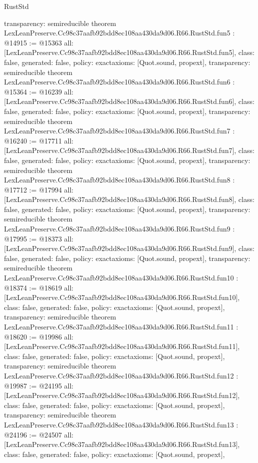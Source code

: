 \begin{lexlean}{RustStd}
\begin{coremodule}
{  transparency: semireducible
}
theorem LexLeanPreserve.Cc98c37aafb92bdd8ec108aa430da9d06.R66.RustStd.fun5 : @14915 := @15363 {
  all: [LexLeanPreserve.Cc98c37aafb92bdd8ec108aa430da9d06.R66.RustStd.fun5],
  class: false,
  generated: false,
  policy: exact{axioms: [Quot.sound, propext]},
  transparency: semireducible
}
theorem LexLeanPreserve.Cc98c37aafb92bdd8ec108aa430da9d06.R66.RustStd.fun6 : @15364 := @16239 {
  all: [LexLeanPreserve.Cc98c37aafb92bdd8ec108aa430da9d06.R66.RustStd.fun6],
  class: false,
  generated: false,
  policy: exact{axioms: [Quot.sound, propext]},
  transparency: semireducible
}
theorem LexLeanPreserve.Cc98c37aafb92bdd8ec108aa430da9d06.R66.RustStd.fun7 : @16240 := @17711 {
  all: [LexLeanPreserve.Cc98c37aafb92bdd8ec108aa430da9d06.R66.RustStd.fun7],
  class: false,
  generated: false,
  policy: exact{axioms: [Quot.sound, propext]},
  transparency: semireducible
}
theorem LexLeanPreserve.Cc98c37aafb92bdd8ec108aa430da9d06.R66.RustStd.fun8 : @17712 := @17994 {
  all: [LexLeanPreserve.Cc98c37aafb92bdd8ec108aa430da9d06.R66.RustStd.fun8],
  class: false,
  generated: false,
  policy: exact{axioms: [Quot.sound, propext]},
  transparency: semireducible
}
theorem LexLeanPreserve.Cc98c37aafb92bdd8ec108aa430da9d06.R66.RustStd.fun9 : @17995 := @18373 {
  all: [LexLeanPreserve.Cc98c37aafb92bdd8ec108aa430da9d06.R66.RustStd.fun9],
  class: false,
  generated: false,
  policy: exact{axioms: [Quot.sound, propext]},
  transparency: semireducible
}
theorem LexLeanPreserve.Cc98c37aafb92bdd8ec108aa430da9d06.R66.RustStd.fun10 : @18374 := @18619 {
  all: [LexLeanPreserve.Cc98c37aafb92bdd8ec108aa430da9d06.R66.RustStd.fun10],
  class: false,
  generated: false,
  policy: exact{axioms: [Quot.sound, propext]},
  transparency: semireducible
}
theorem LexLeanPreserve.Cc98c37aafb92bdd8ec108aa430da9d06.R66.RustStd.fun11 : @18620 := @19986 {
  all: [LexLeanPreserve.Cc98c37aafb92bdd8ec108aa430da9d06.R66.RustStd.fun11],
  class: false,
  generated: false,
  policy: exact{axioms: [Quot.sound, propext]},
  transparency: semireducible
}
theorem LexLeanPreserve.Cc98c37aafb92bdd8ec108aa430da9d06.R66.RustStd.fun12 : @19987 := @24195 {
  all: [LexLeanPreserve.Cc98c37aafb92bdd8ec108aa430da9d06.R66.RustStd.fun12],
  class: false,
  generated: false,
  policy: exact{axioms: [Quot.sound, propext]},
  transparency: semireducible
}
theorem LexLeanPreserve.Cc98c37aafb92bdd8ec108aa430da9d06.R66.RustStd.fun13 : @24196 := @24507 {
  all: [LexLeanPreserve.Cc98c37aafb92bdd8ec108aa430da9d06.R66.RustStd.fun13],
  class: false,
  generated: false,
  policy: exact{axioms: [Quot.sound, propext]},
}
\end{coremodule}
\end{lexlean}
